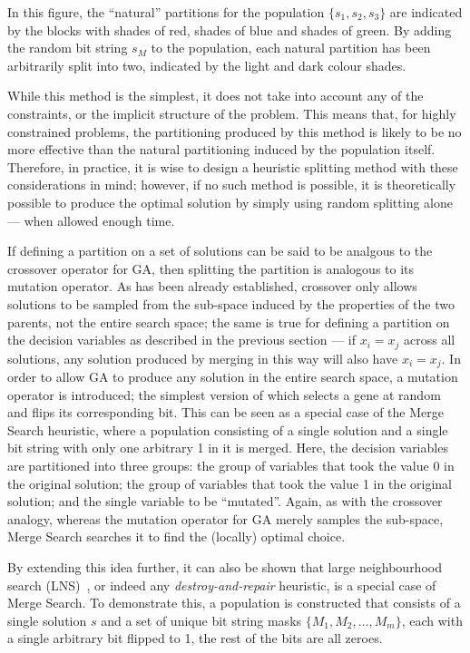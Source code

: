 \documentclass[authoryear,11pt,square,number,times,super,comma]{elsarticle}
\begin{document}
In this figure, the ``natural'' partitions for the population $\{s_1,s_2,s_3\}$ are indicated by the blocks with shades of red, shades of blue and shades of green. By adding the random bit string $s_M$ to the population, each natural partition has been arbitrarily split into two, indicated by the light and dark colour shades.

While this method is the simplest, it does not take into account any of the constraints, or the implicit structure of the problem. This means that, for highly constrained problems, the partitioning produced by this method is likely to be no more effective than the natural partitioning induced by the population itself. Therefore, in practice, it is wise to design a heuristic splitting method with these considerations in mind; however, if no such method is possible, it is theoretically possible to produce the optimal solution by simply using random splitting alone --- when allowed enough time.

\medskip

If defining a partition on a set of solutions can be said to be analgous to the crossover operator for GA, then splitting the partition is analogous to its mutation operator. As has been already established, crossover only allows solutions to be sampled from the sub-space induced by the properties of the two parents, not the entire search space; the same is true for defining a partition on the decision variables as described in the previous section --- if $x_i = x_j$ across all solutions, any solution produced by merging in this way will also have $x_i = x_j$. In order to allow GA to produce any solution in the entire search space, a mutation operator is introduced; the simplest version of which selects a gene at random and flips its corresponding bit. This can be seen as a special case of the Merge Search heuristic, where a population consisting of a single solution and a single bit string with only one arbitrary 1 in it is merged. Here, the decision variables are partitioned into three groups: the group of variables that took the value 0 in the original solution; the group of variables that took the value 1 in the original solution; and the single variable to be ``mutated''. Again, as with the crossover analogy, whereas the mutation operator for GA merely samples the sub-space, Merge Search searches it to find the (locally) optimal choice.

By extending this idea further, it can also be shown that large neighbourhood search (LNS)~\citep{Pisinger2010}, or indeed any \emph{destroy-and-repair} heuristic, is a special case of Merge Search. To demonstrate this, a population is constructed that consists of a single solution $s$ and a set of unique bit string masks $\{M_1,M_2,\dots,M_m\}$, each with a single arbitrary bit flipped to 1, the rest of the bits are all zeroes. 
\end{document}
